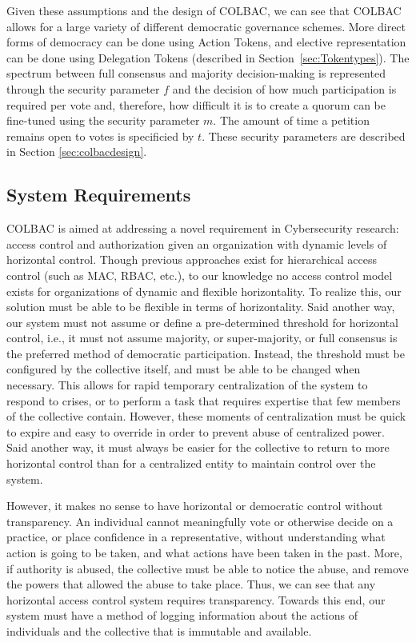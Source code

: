 Given these assumptions and the design of COLBAC, we can see that COLBAC allows
for a large variety of different democratic governance schemes. More direct
forms of democracy can be done using Action Tokens, and elective representation
can be done using Delegation Tokens (described in Section~\ref{sec:Tokentypes}).
The spectrum between full consensus and majority decision-making is represented
through the security parameter $f$ and the decision of how much participation is
required per vote and, therefore, how difficult it is to create a quorum can be
fine-tuned using the security parameter $m$. The amount of time a petition
remains open to votes is specificied by $t$. These security parameters are
described in Section \ref{sec:colbacdesign}.

\subsection{System Requirements}
\label{sec:colbacrequirements}
COLBAC is aimed at addressing a novel requirement in Cybersecurity research:
access control and authorization given an organization with dynamic levels of
horizontal control. Though previous approaches exist for hierarchical access
control (such as MAC, RBAC, etc.), to our knowledge no access control model
exists for organizations of dynamic and flexible horizontality. To realize
this, our solution must be able to be flexible in terms of horizontality. Said
another way, our system must not assume or define a pre-determined threshold for
horizontal control, i.e., it must not assume majority, or super-majority, or
full consensus is the preferred method of democratic participation. Instead,
the threshold must be configured by the collective itself, and must be able to
be changed when necessary. This allows for rapid temporary centralization of the
system to respond to crises, or to perform a task that requires expertise that
few members of the collective contain. However, these moments of centralization
must be quick to expire and easy to override in order to prevent abuse of
centralized power. Said another way, it must always be easier for the collective
to return to more horizontal control than for a centralized entity to maintain
control over the system.

However, it makes no sense to have horizontal or democratic control without
transparency. An individual cannot meaningfully vote or otherwise decide on a
practice, or place confidence in a representative, without understanding what
action is going to be taken, and what actions have been taken in the past.
More, if authority is abused, the collective must be able to notice the abuse,
and remove the powers that allowed the abuse to take place. Thus, we can see
that any horizontal access control system requires transparency. Towards this
end, our system must have a method of logging information about the actions of
individuals and the collective that is immutable and available.

